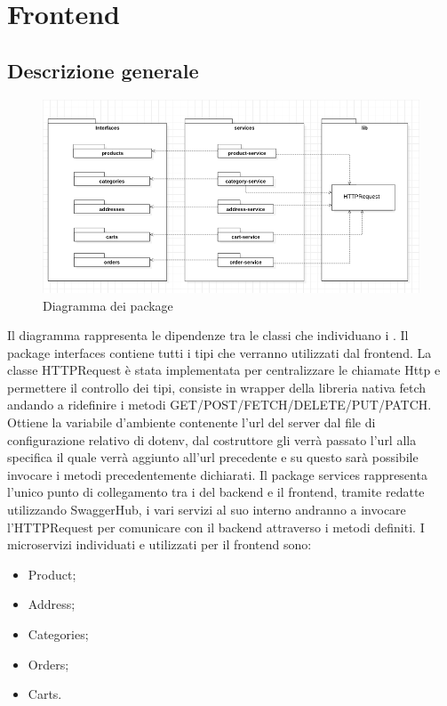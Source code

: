 \newpage
\section{Frontend}\label{Frontend}
\subsection{Descrizione generale}
\begin{figure}[H]
	\centering
	\includegraphics[scale=0.6]{Immagini/Frontend/DiagrammadeiPackage.png}
	\caption{Diagramma dei package}
	\label{fig:fe-packages}
\end{figure}
Il diagramma rappresenta le dipendenze tra le classi che individuano i . Il package interfaces contiene tutti i tipi che verranno utilizzati dal frontend. La classe HTTPRequest è stata implementata per centralizzare le chiamate Http e permettere il controllo dei tipi, consiste in wrapper della libreria nativa fetch andando a ridefinire i metodi GET/POST/FETCH/DELETE/PUT/PATCH. Ottiene la variabile d'ambiente contenente l'url del server dal file di configurazione relativo di dotenv, dal costruttore gli verrà passato l'url alla specifica  il quale verrà aggiunto all'url precedente e su questo sarà possibile invocare i metodi precedentemente dichiarati.
Il package services rappresenta l'unico punto di collegamento tra i  del backend e il frontend, tramite  redatte utilizzando SwaggerHub, i vari servizi al suo interno andranno a invocare l'HTTPRequest per comunicare con il backend attraverso i metodi definiti.
I microservizi individuati e utilizzati per il frontend sono:
\begin{itemize}
	\item Product;
	\item Address;
	\item Categories;
	\item Orders;
	\item Carts.
\end{itemize}
